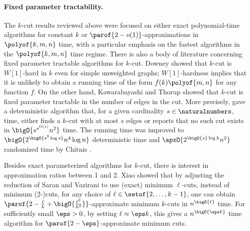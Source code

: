 \documentclass[11pt]{article}
\numberwithin{equation}{section}
\theoremstyle{definition}
\theoremstyle{plain}
\begin{document}
\paragraph{Fixed parameter tractability.}
The $k$-cut results reviewed above were focused on either exact
polynomial-time algorithms for constant $k$ or
$\parof{2 - o(1)}$-approximations in $\polyof{k,m,n}$ time, with a
particular emphasis on the fastest algorithms in the $\polyof{k,m,n}$
time regime. There is also a body of literature concerning fixed
parameter tractable algorithms for $k$-cut. Downey \etal
\cite{defpr-03} showed that $k$-cut is $W[1]$-hard in $k$ even for
simple unweighted graphs; $W[1]$-hardness implies that it is unlikely
to obtain a running time of the form $f(k) \polyof{m,n}$ for any
function $f$. On the other hand, Kawarabayashi and Thorup \cite{kt-11}
showed that $k$-cut is fixed parameter tractable in the number of
edges in the cut. More precisely, \cite{kt-11} gave a deterministic
algorithm that, for a given cardinality $s \in \naturalnumbers$, time,
either finds a $k$-cut with at most $s$ edges or reports that no such
cut exists in
\begin{math}
  \bigO{s^{s^{O(s)}} n^2}
\end{math}
time. The running time was improved to
\begin{math}
  \bigO{2^{\bigO{s^2 \log s}}n^4 \log n}
\end{math}
deterministic time and
\begin{math}
  \apxO{2^{\bigO{s} \log k} n^2}
\end{math}
randomized time by Chitnis \etal \cite{cchpp-16}.

Besides exact parameterized algorithms for $k$-cut, there is interest
in approximation ratios between 1 and 2.  Xiao \etal
\cite{xcy-11} showed that by adjusting the reduction of Saran and
Vazirani \cite{sv-95} to use (exact) minimum
%
%
%
$\ell$-cuts, %
instead of %
minimum (2-)cuts, for any choice of $\ell \in \setof{2,\dots,k-1}$,
%
%
one can obtain %
\begin{math}
  \parof{2 - \frac{\ell}{k} + \bigO{\frac{\ell^2}{k^2}}}
\end{math}-approximate minimum $k$-cuts in
\begin{math}
  n^{\bigO{\ell}}
\end{math}
time.  For sufficiently small $\eps > 0$, by setting
$\ell \approx \eps k$, this gives a
\begin{math}
  n^{\bigO{\eps k}}
\end{math}
time algorithm for $\parof{2 - \eps}$-approximate minimum cuts.
\end{document}
